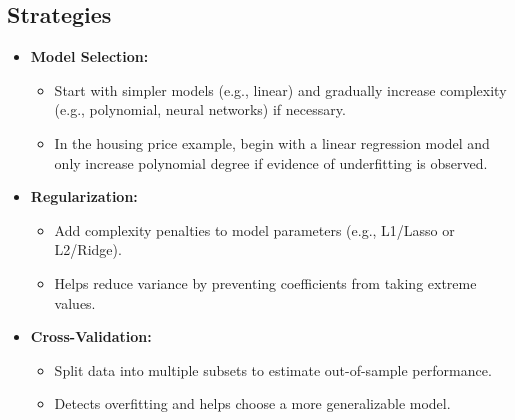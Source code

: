 \documentclass{article}
\begin{document}
\subsection{Strategies}
\begin{itemize}
    \item \textbf{Model Selection:} 
    \begin{itemize}
        \item Start with simpler models (e.g., linear) and gradually increase complexity (e.g., polynomial, neural networks) if necessary.
        \item In the housing price example, begin with a linear regression model and only increase polynomial degree if evidence of underfitting is observed.
    \end{itemize}
    \item \textbf{Regularization:}
    \begin{itemize}
        \item Add complexity penalties to model parameters (e.g., L1/Lasso or L2/Ridge).
        \item Helps reduce variance by preventing coefficients from taking extreme values.
    \end{itemize}
    \item \textbf{Cross-Validation:}
    \begin{itemize}
        \item Split data into multiple subsets to estimate out-of-sample performance.
        \item Detects overfitting and helps choose a more generalizable model.
    \end{itemize}
\end{itemize}
\end{document}
